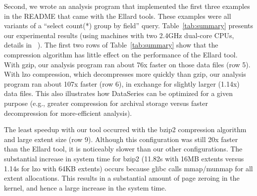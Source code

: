 \documentclass{acm_proc_article-sp}
\begin{document}
Second, we
wrote an analysis program that implemented the first three examples in
the README that came with the Ellard tools.  
These examples were
all variants of a ``select count(*) group by field'' query.
Table~\ref{tab:summary} presents our experimental results
(using machines with two 2.4GHz dual-core CPUs, details 
in ~\cite{DSTechnicalReportSnapshot}).
The first two rows of Table~\ref{tab:summary} show that the compression 
algorithm has little effect on the performance
of the Ellard tool.  
With gzip, our analysis program ran about 76x faster on those data files 
(row 5).
With lzo compression, which decompresses more quickly than
gzip, our analysis program ran about 107x faster (row 6), in exchange for
slightly larger (1.14x) data files.  This also illustrates how
DataSeries can be optimized for a given purpose (e.g., greater
compression for archival storage versus faster decompression for 
more-efficient analysis). 

The least speedup with our tool occurred with the bzip2 compression
algorithm and large extent size (row 9).
Although this configuration was still 20x faster than the Ellard tool,
it is noticeably slower than our other configurations.  The substantial
increase in system time for bzip2 (11.82s with 16MB extents versus
1.14s for lzo with 64KB extents) occurs because glibc calls
mmap/munmap for all extent allocations.  This results in a substantial amount of page
zeroing in the kernel, and hence a large increase in the system time. 



\end{document}
